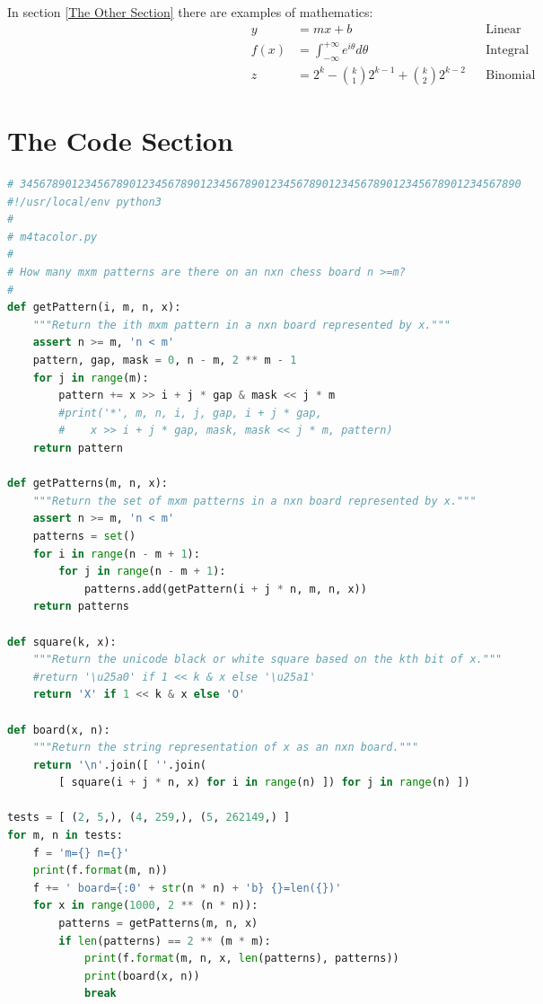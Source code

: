 \documentclass[11pt]{article}%
\begin{document}
\begin{multicols*}{2}
In section \ref{The Other Section} there are examples of
mathematics:\begin{align}
y &= mx+b && \text{Linear} \\
f(x) &= \int_{-\infty}^{+\infty} e^{i\theta} d\theta && \text{Integral} \\
z &= 2^k-\binom{k}{1}2^{k-1}+\binom{k}{2}2^{k-2} &&\text{Binomial}
\end{align}

\section{The Code Section}
\label{The Code Section}

\begin{lstlisting}[language=Python,caption=\code{m4tacolor.py} module,label=m4tacolor]
# 345678901234567890123456789012345678901234567890123456789012345678901234567890
#!/usr/local/env python3
#
# m4tacolor.py
#
# How many mxm patterns are there on an nxn chess board n >=m?
#
def getPattern(i, m, n, x):
    """Return the ith mxm pattern in a nxn board represented by x."""
    assert n >= m, 'n < m'
    pattern, gap, mask = 0, n - m, 2 ** m - 1
    for j in range(m):
        pattern += x >> i + j * gap & mask << j * m
        #print('*', m, n, i, j, gap, i + j * gap, 
        #    x >> i + j * gap, mask, mask << j * m, pattern)
    return pattern

def getPatterns(m, n, x):
    """Return the set of mxm patterns in a nxn board represented by x."""
    assert n >= m, 'n < m'
    patterns = set()
    for i in range(n - m + 1):
        for j in range(n - m + 1):
            patterns.add(getPattern(i + j * n, m, n, x))
    return patterns

def square(k, x):
    """Return the unicode black or white square based on the kth bit of x."""
    #return '\u25a0' if 1 << k & x else '\u25a1'
    return 'X' if 1 << k & x else 'O'

def board(x, n):
    """Return the string representation of x as an nxn board."""
    return '\n'.join([ ''.join(
        [ square(i + j * n, x) for i in range(n) ]) for j in range(n) ])

tests = [ (2, 5,), (4, 259,), (5, 262149,) ]
for m, n in tests:
    f = 'm={} n={}'
    print(f.format(m, n))
    f += ' board={:0' + str(n * n) + 'b} {}=len({})'
    for x in range(1000, 2 ** (n * n)):
        patterns = getPatterns(m, n, x)
        if len(patterns) == 2 ** (m * m):
            print(f.format(m, n, x, len(patterns), patterns))
            print(board(x, n))
            break
\end{lstlisting}


\end{multicols*}
\end{document}

